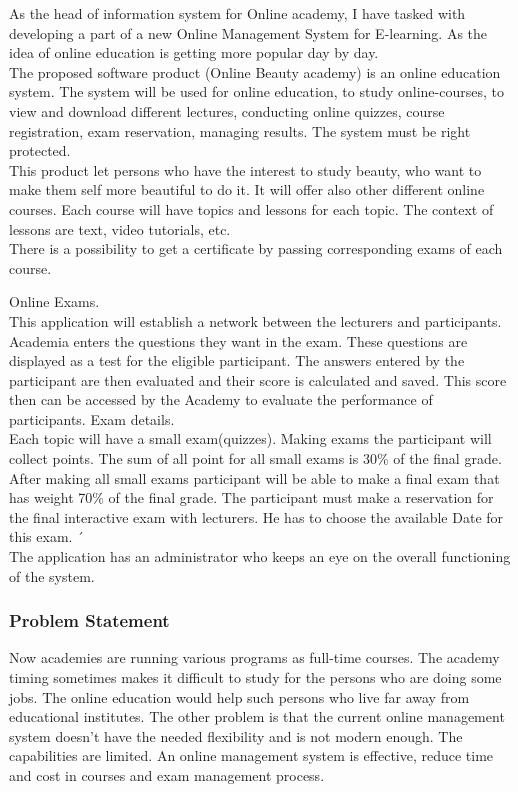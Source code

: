 \documentclass{scrartcl}
\begin{document}
As the head of information system for Online academy, I have tasked with developing a part of a new Online Management System for E-learning. As the idea of online education is getting more popular day by day. \\
The proposed software product (Online Beauty academy) is an online education system. The system will be used for online education, to study online-courses, to view and download different lectures, conducting online quizzes, course registration, exam reservation, managing results. The system must be right protected.\\
This product let persons who have the interest to study beauty, who want to make them self more beautiful to do it. It will offer also other different online courses. 
 Each course will have topics and lessons for each topic. The context of lessons are text, video tutorials, etc. \\
 There is a possibility to get a certificate by passing corresponding exams of each course.


Online Exams.\\
 This application will establish a network between the lecturers and participants. Academia enters the questions they want in the exam. These questions are displayed as a test for the eligible participant. The answers entered by the participant are then evaluated and their score is calculated and saved. This score then can be accessed by the Academy to evaluate the performance of participants.
Exam details.\\
Each topic will have a small exam(quizzes). Making exams the participant will collect points. The sum of all point for all small exams is 30\% of the final grade. After making all small exams participant will be able to make a final exam that has weight 70\% of the final grade. The participant must make a reservation for the final interactive exam with lecturers. He has to choose the available Date for this exam. ´\\

The application has an administrator who keeps an eye on the overall functioning of the system.

  	
  	\subsubsection{Problem Statement}
  	Now academies are running various programs as full-time courses. The academy timing sometimes makes it difficult to study for the persons who are doing some jobs. The online education would help such persons who live far away from educational institutes.
The other problem is that the current online management system doesn't have the needed flexibility and is not modern enough. The capabilities are limited.
An online management system is effective, reduce time and cost in courses and exam management process.
\end{document}

